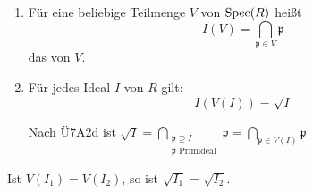 \documentclass[a4paper, 10pt]{report}
\begin{document}
\begin{DefBem}

\begin{enumerate}
\item F\"ur eine beliebige Teilmenge $V$ von $\mathrm{Spec}(R)$ hei\ss t $$\displaystyle I(V) = \bigcap_{\mathfrak{p} \in V} \mathfrak{p}$$ das  von $V$.

\item F\"ur jedes Ideal $I$ von $R$ gilt:
$$I(V(I)) = \sqrt{I}$$

\begin{Bew}
Nach \"U7A2d ist $\displaystyle \sqrt{I} = \bigcap_{\substack{\mathfrak{p} \supseteq I \\ \mathfrak{p} \text{ Primideal}}} \mathfrak{p} = \bigcap_{\mathfrak{p} \in V(I)} \mathfrak{p}$
\end{Bew}

\end{enumerate}

\end{DefBem}

\begin{nnFolg}
Ist $V(I_1) = V(I_2)$, so ist $\sqrt{I_1} = \sqrt{I_2}$.
\end{nnFolg}
\end{document}
